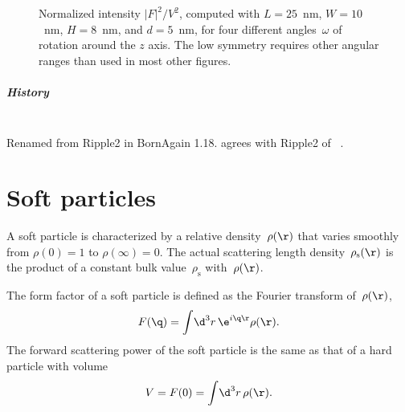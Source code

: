 \begin{figure}[H]
\begin{center}
\end{center}
\caption{Normalized intensity $|F|^2/V^2$,
computed with $L=25$~nm, $W=10$~nm, $H=8$~nm, and $d=5$~nm,
for four different angles~$\omega$ of rotation around the $z$ axis.
The low symmetry requires other angular ranges than used in most other figures.}
\end{figure}

\paragraph{History}\strut\\
Renamed from Ripple2 in BornAgain 1.18.
 agrees with Ripple2 of \FitGISAXS\ \cite{Bab13}.


\chapter{Soft particles}\label{SSoft}

A soft particle is characterized by a relative density~$\rho(\r)$
%
%
that varies smoothly from $\rho(0)=1$ to $\rho(\infty)=0$.
The actual scattering length density~$\rho_\text{s}(\r)$
%
is the product of a constant bulk value~$\rho_\text{s}$ with~$\rho(\r)$.

The form factor of a soft particle is defined as the Fourier transform of~$\rho(\r)$,
%
\begin{equation}
  F(\q) = \int\!\d^3r\,\e^{i\q\r}\rho(\r).
\end{equation}
The forward scattering power of the soft particle is the same
as that of a hard particle with volume
\begin{equation}
  V = F(0) = \int\!\d^3r\,\rho(\r).
\end{equation}

 \label{SGauss}

